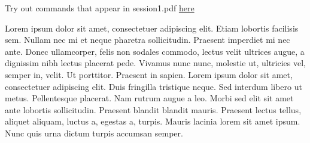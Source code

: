 \documentclass[a4paper,12pt]{article} %
\begin{document}
	
Try out commands that appear in session1.pdf \href{https://github.com/kunilovskaya/dskills\_workshop/blob/main/w1\_latex\_basics/s1/session1.pdf}{here}
	

Lorem ipsum dolor sit amet, consectetuer adipiscing elit. Etiam lobortis facilisis sem. Nullam nec mi et neque pharetra sollicitudin. Praesent imperdiet mi nec ante. Donec ullamcorper, felis non sodales commodo, lectus velit ultrices augue, a dignissim nibh lectus placerat pede. Vivamus nunc nunc, molestie ut, ultricies vel, semper in, velit. Ut porttitor. Praesent in sapien. Lorem ipsum dolor sit amet, consectetuer adipiscing elit. Duis fringilla tristique neque. Sed interdum libero ut metus. Pellentesque placerat. Nam rutrum augue a leo. Morbi sed elit sit amet ante lobortis sollicitudin. Praesent blandit blandit mauris. Praesent lectus tellus, aliquet aliquam, luctus a, egestas a, turpis. Mauris lacinia lorem sit amet ipsum. Nunc quis urna dictum turpis accumsan semper.
\end{document}
